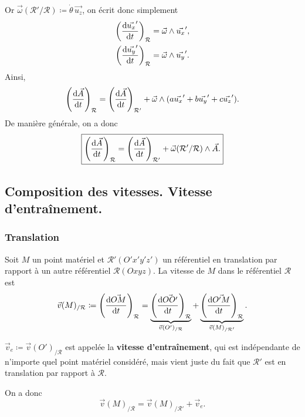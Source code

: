         Or $\vec{\omega}(\mathcal{R}'/\mathcal{R})\coloneqq\dot{\theta}\,\vec{u_z}$, on écrit donc simplement
        \begin{equation*}
            \begin{aligned}
                \left(\frac{\mathrm{d}\vec{u_x}'}{\mathrm{d} t}\right)_{\mathcal{R}} &=\vec{\omega}\wedge\vec{u_x}',\\
                \left(\frac{\mathrm{d}\vec{u_y}'}{\mathrm{d} t}\right)_{\mathcal{R}} &=\vec{\omega}\wedge\vec{u_y}'.
            \end{aligned}
        \end{equation*}
        Ainsi,
        \begin{equation*}
            \left(\frac{\mathrm{d}\vec{A}}{\mathrm{d} t}\right)_{\mathcal{R}}=\left(\frac{\mathrm{d}\vec{A}}{\mathrm{d} t}\right)_{\mathcal{R}'}+\vec{\omega}\wedge(a\vec{u_x}'+b\vec{u_y}'+c\vec{u_z}').
        \end{equation*}
        De manière générale, on a donc 
        \begin{equation*}
            \boxed{
                \left(\frac{\mathrm{d}\vec{A}}{\mathrm{d} t}\right)_{\mathcal{R}}=\left(\frac{\mathrm{d}\vec{A}}{\mathrm{d} t}\right)_{\mathcal{R}'}+\vec{\omega}(\mathcal{R}'/\mathcal{R})\wedge\vec{A}.
            }
        \end{equation*}
    
    \subsection{Composition des vitesses. Vitesse d'entraînement.}
        \subsubsection{Translation}

            Soit $M$ un point matériel et $\mathcal{R}'(O'x'y'z')$ un référentiel en translation par rapport à un autre référentiel $\mathcal{R}(Oxyz)$. La vitesse de $M$ dans le référentiel $\mathcal{R}$ est
            \begin{equation*}
                \vec{v}(M)_{/\mathcal{R}}\coloneqq\left(\frac{\mathrm{d}\vec{OM}}{\mathrm{d} t}\right)_{\mathcal{R}}=\underbrace{\left(\frac{\mathrm{d} \vec{OO'}}{\mathrm{d} t}\right)_{\mathcal{R}}}_{\vec{v}(O')_{/\mathcal{R}}}+\underbrace{\left(\frac{\mathrm{d}\vec{O'M}}{\mathrm{d} t}\right)_{\mathcal{R}}}_{\vec{v}(M)_{/\mathcal{R}'}}.
            \end{equation*}
            \begin{definition}
                $\vec{v}_e\coloneqq\vec{v}(O')_{/\mathcal{R}}$ est appelée la \textbf{vitesse d'entraînement}, qui est indépendante de n'importe quel point matériel considéré, mais vient juste du fait que $\mathcal{R}'$ est en translation par rapport à $\mathcal{R}$.
            \end{definition}
            On a donc
            \begin{equation*}
                \boxed{
                    \vec{v}(M)_{/\mathcal{R}}=\vec{v}(M)_{/\mathcal{R}'}+\vec{v}_e.
                }
            \end{equation*}

